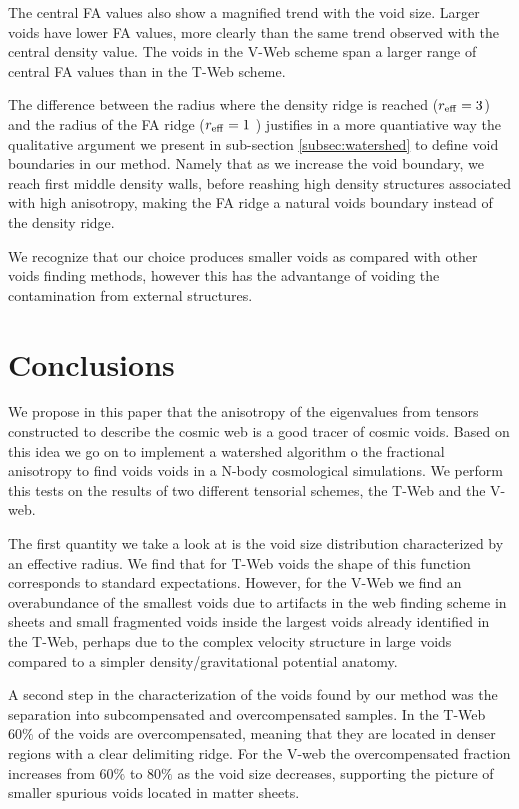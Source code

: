 \documentclass[a4,useAMS,usenatbib,usegraphicx]{mn2e}
\begin{document}
The central FA values also show a magnified trend with the void size. 
Larger voids have lower FA values, more clearly than the same trend
observed with the central density value. 
The voids in the V-Web scheme span a larger range of central FA values
than in the T-Web scheme. 

The difference between the radius where the density ridge is reached 
($r_{\rm eff}=3$) and the radius of the FA  ridge ($r_{\rm eff}=1$ )
justifies in a more quantiative way the qualitative argument
we present in sub-section \ref{subsec:watershed} to define void boundaries in
our method.  Namely that as we increase the void boundary, we reach
first middle density walls, before reashing high density structures
associated with high anisotropy, making the FA  ridge a  natural voids
boundary instead of the density ridge.  

We recognize that our choice produces smaller voids as compared with
other voids finding methods, however this has the advantange of
voiding the contamination from external structures.


\section{Conclusions}
\label{sec:conclusions}

We propose in this paper that the anisotropy of the eigenvalues from
tensors constructed to describe the cosmic web is a good tracer of
cosmic voids. Based on this idea we go on to implement a watershed
algorithm o the fractional anisotropy to find voids voids in a N-body
cosmological simulations. We perform this tests on the results of two
different tensorial schemes, the T-Web and the V-web.

The first quantity we take a look at is the void size distribution
characterized by an effective radius. 
We find that for T-Web voids the shape of this function corresponds to
standard expectations. 
However, for the V-Web we find an overabundance of the smallest voids
due to artifacts in the web finding scheme in sheets and small
fragmented voids inside the largest voids already identified in the
T-Web, perhaps due to the complex velocity structure in large voids
compared to a simpler density/gravitational potential anatomy.
 
A second step in the characterization of the voids found by our method
was the separation into subcompensated and overcompensated samples. 
In the T-Web $60\%$ of the voids are overcompensated, meaning that
they are located in denser regions with a clear delimiting ridge. 
For the V-web the overcompensated fraction increases from $60\%$ to
$80\%$ as the void size decreases, supporting the picture of smaller
spurious voids located in matter sheets.
\end{document}
